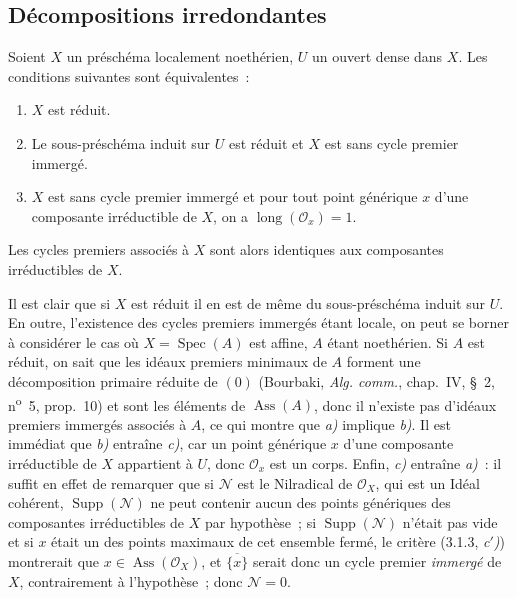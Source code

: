 \subsection{Décompositions irredondantes}

\begin{proposition}[3.2.1]
\label{IV.2.3.2.1-fr}
Soient $X$ un préschéma localement noethérien, $U$ un ouvert dense dans $X$.
Les conditions suivantes sont équivalentes~:
\begin{enumerate}
\item[\emph{a)}] $X$ est réduit.
\item[\emph{b)}] Le sous-préschéma induit sur $U$ est réduit et $X$ est sans
cycle premier immergé.
\item[\emph{c)}] $X$ est sans cycle premier immergé et pour tout point
générique $x$ d'une composante irréductible de $X$, on a
$\operatorname{long}(\mathcal O_x)=1$.
\end{enumerate}
Les cycles premiers associés à $X$ sont alors identiques aux composantes
irréductibles de $X$.
\end{proposition}

Il est clair que si $X$ est réduit il en est de même du sous-préschéma induit
sur $U$. En outre, l'existence des cycles premiers immergés étant locale, on
peut se borner à considérer le cas où $X=\operatorname{Spec}(A)$ est affine,
$A$ étant noethérien. Si $A$ est réduit, on sait que les idéaux premiers
minimaux de $A$ forment une décomposition primaire réduite de $(0)$
(Bourbaki, \emph{Alg. comm.}, chap.~IV, \S~2, n\textsuperscript{o}~5,
prop.~10) et sont les éléments de $\operatorname{Ass}(A)$, donc il n'existe
pas d'idéaux premiers immergés associés à $A$, ce qui montre que \emph{a)}
implique \emph{b)}. Il est immédiat que \emph{b)} entraîne \emph{c)}, car un
point générique $x$ d'une composante irréductible de $X$ appartient à $U$,
donc $\mathcal O_x$ est un corps. Enfin, \emph{c)} entraîne \emph{a)}~: il
suffit en effet de remarquer que si $\mathcal N$ est le Nilradical de
$\mathcal O_X$, qui est un Idéal cohérent, $\operatorname{Supp}(\mathcal N)$
ne peut contenir aucun des points génériques des composantes irréductibles de
$X$ par hypothèse~; si $\operatorname{Supp}(\mathcal N)$ n'était pas vide et
si $x$ était un des points maximaux de cet ensemble fermé, le critère
(3.1.3, \emph{c$'$)}) montrerait que $x\in\operatorname{Ass}(\mathcal O_X)$,
et $\overline{\{x\}}$ serait donc un cycle premier \emph{immergé} de $X$,
contrairement à l'hypothèse~; donc $\mathcal N=0$.

